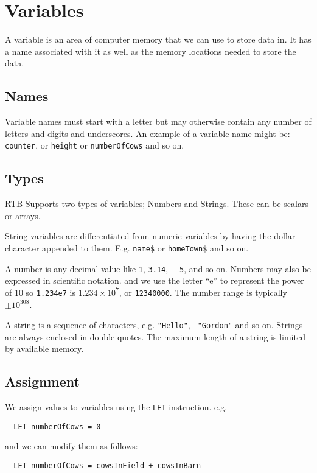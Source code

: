 \chapter{Variables}
\setcounter{ch-variables}{\value{chapter}}
\setcounter{ch-variables-page}{\value{page}}

A variable is an area of computer memory that we can use to store data
in. It has a name associated with it as well as the memory locations
needed to store the data.

\section{Names}
Variable names must start with a letter but may otherwise contain any
number of letters and digits and underscores. An example of a variable
name might be: {\tt counter}, or {\tt height} or {\tt numberOfCows}
and so on.

\section{Types}
RTB Supports two types of variables; Numbers and Strings. These can
be scalars or arrays.

String variables are differentiated from numeric variables
by having the dollar character appended to them. E.g. {\tt name\$}
or {\tt homeTown\$} and so on.

A number is any decimal value like {\tt 1}, {\tt 3.14}, {\tt
-5}, and so on. Numbers may also be expressed in  scientific
notation.  and we use the letter ``e''
to represent the power of 10 so {\tt 1.234e7} is {\tt $1.234\times 10^7$},
or {\tt 12340000}. The number range is typically $\pm 10^{308}$.

A string is a sequence of characters, e.g. {\tt "Hello"}, {\tt
"Gordon"} and so on. Strings are always enclosed in double-quotes. The
maximum length of a string is limited by available memory.

\section{Assignment}
We assign values to variables using the {\tt LET} instruction. e.g.
\begin{verbatim}
  LET numberOfCows = 0
\end{verbatim}
and we can modify them as follows:
\begin{verbatim}
  LET numberOfCows = cowsInField + cowsInBarn
\end{verbatim}

